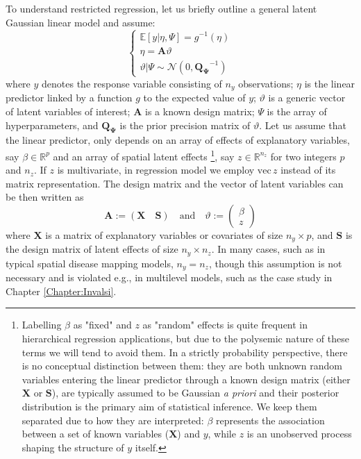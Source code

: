 \documentclass[openany, 11pt, oneside]{book}
\begin{document}
To understand restricted regression, let us briefly outline a general latent Gaussian linear model and assume:
%
$$
\left\{ \begin{array}{ll} 
\mathbb{E}\left[y \vert \eta, \Psi \right] = g^{-1}(\eta) \\
\eta = \boldsymbol{A} \vartheta \\
\vartheta \vert \Psi \sim \mathcal{N}(0, \boldsymbol{Q_{\Psi}}^{-1})
\end{array} \right. 
$$
%
where $y$ denotes the response variable consisting of $n_y$ observations; $\eta$ is the linear predictor linked by a function $g$ to the expected value of $y$; $\vartheta$ is a generic vector of latent variables of interest; $\boldsymbol{A}$ is a known design matrix; $\Psi$ is the array of hyperparameters, and $\boldsymbol{Q_{\Psi}}$ is the prior precision matrix of $\vartheta$. Let us assume that the linear predictor, only depends on an array of effects of explanatory variables, say $\beta \in \mathbb{R}^p$ and an array of spatial latent effects \footnote{Labelling $\beta$ as "fixed" and $z$ as "random" effects is quite frequent in hierarchical regression applications, but due to the polysemic nature of these terms we will tend to avoid them. In a strictly probability perspective, there is no conceptual distinction between them: they are both unknown random variables entering the linear predictor through a known design matrix (either $\boldsymbol{X}$ or $\boldsymbol{S}$), are typically assumed to be Gaussian \textit{a priori} and their posterior distribution is the primary aim of statistical inference. We keep them separated due to how they are interpreted: $\beta$ represents the association between a set of known variables ($\boldsymbol{X}$) and $y$, while $z$ is an unobserved process shaping the structure of $y$ itself.}, say $z \in \mathbb{R}^{n_z}$ for two integers $p$ and $n_z$. If $z$ is multivariate, in regression model we employ $\mathrm{vec}\, z$ instead of its matrix representation. The design matrix and the vector of latent variables can be then written as
$$  
\boldsymbol{A} := 
\left(\boldsymbol{X} \quad \boldsymbol{S} \right) 
\quad \text{and} \quad
\vartheta := \begin{pmatrix} \beta \\ z \end{pmatrix}
$$
where $\boldsymbol{X}$ is a matrix of explanatory variables or covariates of size $n_y \times p$, and $\boldsymbol{S}$ is the design matrix of latent effects of size $n_y \times n_z$. In many cases, such as in typical spatial disease mapping models, $n_y=n_z$, though this assumption is not necessary and is violated e.g., in multilevel models, such as the case study in Chapter \ref{Chapter:Invalsi}.
\end{document}
